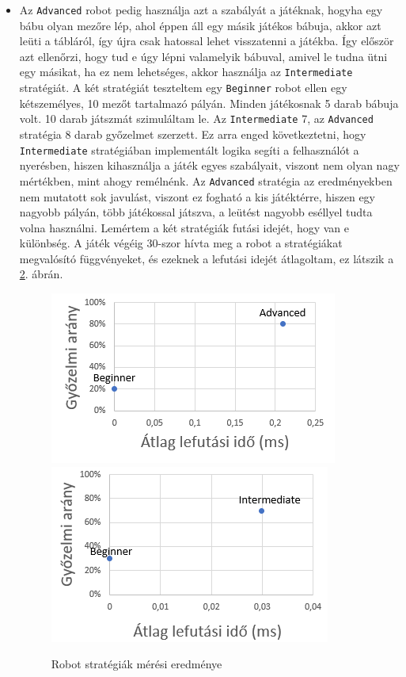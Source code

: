 \documentclass[a4paper,twoside]{article}
\begin{document}
\begin{itemize}
\begin{figure}
		\label{findClos}
	\end{figure}
	\FloatBarrier
	\item  Az \verb|Advanced| robot pedig használja azt a szabályát a játéknak, hogyha egy bábu olyan mezőre lép, ahol éppen áll egy másik játékos bábuja, akkor azt leüti a tábláról, így újra csak hatossal lehet visszatenni a játékba. Így először azt ellenőrzi, hogy tud e úgy lépni valamelyik bábuval, amivel le tudna ütni egy másikat, ha ez nem lehetséges, akkor használja az \verb|Intermediate| stratégiát.
	A két stratégiát teszteltem egy \verb|Beginner| robot ellen egy kétszemélyes, 10 mezőt tartalmazó pályán. Minden játékosnak 5 darab bábuja volt. 10 darab játszmát szimuláltam le. Az \verb|Intermediate| 7, az \verb|Advanced| stratégia 8 darab győzelmet szerzett. Ez arra enged következtetni, hogy \verb|Intermediate| stratégiában implementált logika segíti a felhasználót a nyerésben, hiszen kihasználja a játék egyes szabályait, viszont nem olyan nagy mértékben, mint ahogy remélnénk. Az \verb|Advanced| stratégia az eredményekben nem mutatott sok javulást, viszont ez fogható a kis játéktérre, hiszen egy nagyobb pályán, több játékossal játszva, a leütést nagyobb eséllyel tudta volna használni. Lemértem a két stratégiák futási idejét, hogy van e különbség. A játék végéig 30-szor hívta meg a robot a stratégiákat megvalósító függvényeket, és ezeknek a lefutási idejét átlagoltam, ez látszik a \ref{robot-abra}. ábrán. 
	\begin{figure}
		\caption{Robot stratégiák mérési eredménye}
		\label{robot-abra}
		\centering
		\includegraphics[scale=0.6]{rob-abra1}
		\includegraphics[scale=0.6]{rob-abra2}
	\end{figure}
\end{itemize}
 
\end{document}
